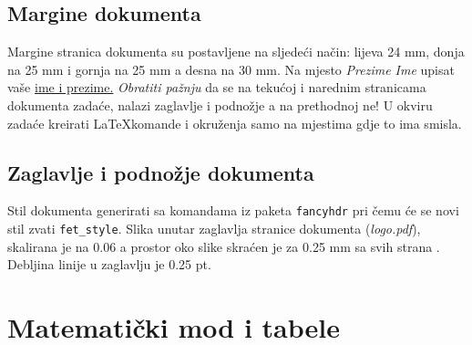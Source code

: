 \documentclass[a4paper,10pt]{article}
\begin{document}
\newpage
\pagestyle{fet_style}
\subsection{Margine dokumenta}
Margine stranica dokumenta su postavljene na sljedeći način: lijeva 24 mm, donja na 25 mm i gornja na 25 mm a desna na 30 mm. Na mjesto \textsl{Prezime Ime} upisat vaše \underline{ime i prezime.} {\color{color2}\textsl{Obratiti pažnju}} da se na tekućoj i narednim stranicama dokumenta zadaće, nalazi zaglavlje i podnožje a na prethodnoj ne! U okviru zadaće kreirati \LaTeX  komande i okruženja samo na mjestima gdje to ima smisla.



\subsection{Zaglavlje i podnožje dokumenta}
\textrm{Stil dokumenta generirati sa komandama iz paketa \texttt{fancyhdr} pri čemu će se novi stil zvati \texttt{fet\_style}. Slika unutar zaglavlja stranice dokumenta (\textsl{logo.pdf}), skalirana je na 0.06 a prostor oko slike skraćen je za 0.25 mm sa svih strana}  . Debljina linije u zaglavlju je 0.25 pt.



\section{Matematički mod i tabele}
\end{document}
